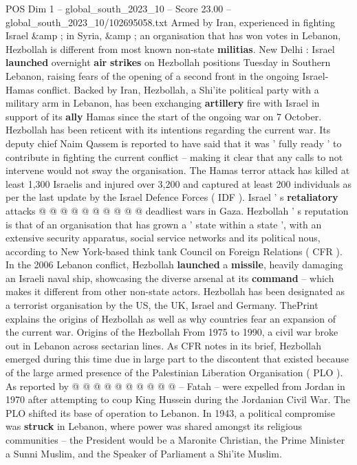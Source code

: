 \begin{textsample}{POS Dim 1 – global\_south\_2023\_10 – Score 23.00 – global\_south\_2023\_10/102695058.txt}  \label{ex:f1_pos_052}
Armed by Iran, experienced in fighting Israel \&amp ; in Syria, \&amp ; an organisation that has won votes in Lebanon, Hezbollah is different from most known non-state \textbf{militias}.
New Delhi : Israel \textbf{launched} overnight \textbf{air} \textbf{strikes} on Hezbollah positions Tuesday in Southern Lebanon, raising fears of the opening of a second front in the ongoing Israel- Hamas conflict.
Backed by Iran, Hezbollah, a Shi'ite political party with a military arm in Lebanon, has been exchanging \textbf{artillery} fire with Israel in support of its \textbf{ally} Hamas since the start of the ongoing war on 7 October.
Hezbollah has been reticent with its intentions regarding the current war.
Its deputy chief Naim Qassem is reported to have said that it was ' fully ready ' to contribute in fighting the current conflict -- making it clear that any calls to not intervene would not sway the organisation.
The Hamas terror attack has killed at least 1,300 Israelis and injured over 3,200 and captured at least 200 individuals as per the last update by the Israel Defence Forces ( IDF ).
Israel ' s \textbf{retaliatory} attacks @ @ @ @ @ @ @ @ @ @ deadliest wars in Gaza.
Hezbollah ' s reputation is that of an organisation that has grown a ' state within a state ', with an extensive security apparatus, social service networks and its political nous, according to New York-based think tank Council on Foreign Relations ( CFR ).
In the 2006 Lebanon conflict, Hezbollah \textbf{launched} a \textbf{missile}, heavily damaging an Israeli naval ship, showcasing the diverse arsenal at its \textbf{command} -- which makes it different from other non-state actors.
Hezbollah has been designated as a terrorist organisation by the US, the UK, Israel and Germany.
ThePrint explains the origins of Hezbollah as well as why countries fear an expansion of the current war.
Origins of the Hezbollah From 1975 to 1990, a civil war broke out in Lebanon across sectarian lines.
As CFR notes in its brief, Hezbollah emerged during this time due in large part to the discontent that existed because of the large armed presence of the Palestinian Liberation Organisation ( PLO ).
As reported by @ @ @ @ @ @ @ @ @ @ -- Fatah -- were expelled from Jordan in 1970 after attempting to coup King Hussein during the Jordanian Civil War.
The PLO shifted its base of operation to Lebanon.
In 1943, a political compromise was \textbf{struck} in Lebanon, where power was shared amongst its religious communities -- the President would be a Maronite Christian, the Prime Minister a Sunni Muslim, and the Speaker of Parliament a Shi'ite Muslim.

\end{textsample}
